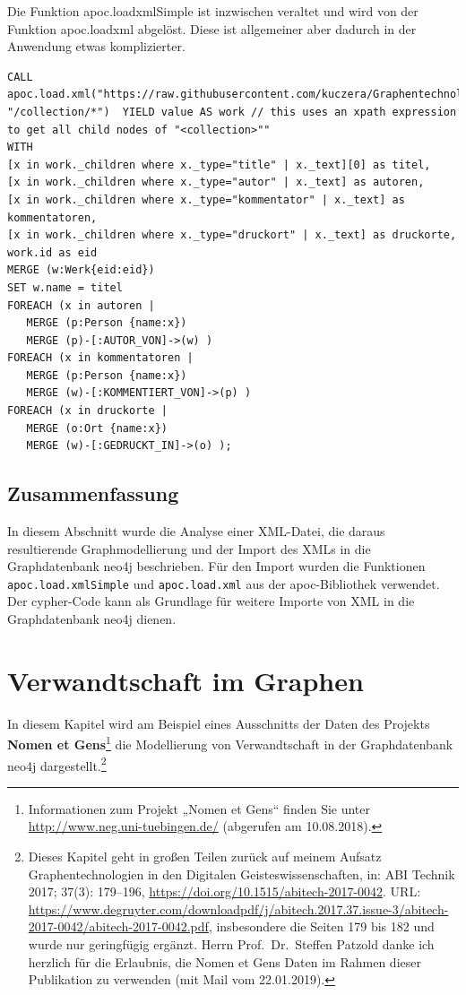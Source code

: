 \documentclass[ngerman,]{scrreprt}
\begin{document}
Die Funktion apoc.loadxmlSimple ist inzwischen veraltet und wird von der Funktion apoc.loadxml abgelöst. Diese ist allgemeiner aber dadurch in der Anwendung etwas komplizierter.

\begin{verbatim}
CALL
apoc.load.xml("https://raw.githubusercontent.com/kuczera/Graphentechnologien/master/docs/data/kollatz.xml", "/collection/*")  YIELD value AS work // this uses an xpath expression to get all child nodes of "<collection>""
WITH
[x in work._children where x._type="title" | x._text][0] as titel,
[x in work._children where x._type="autor" | x._text] as autoren,
[x in work._children where x._type="kommentator" | x._text] as kommentatoren,
[x in work._children where x._type="druckort" | x._text] as druckorte,
work.id as eid
MERGE (w:Werk{eid:eid})
SET w.name = titel
FOREACH (x in autoren |
   MERGE (p:Person {name:x})
   MERGE (p)-[:AUTOR_VON]->(w) )
FOREACH (x in kommentatoren |
   MERGE (p:Person {name:x})
   MERGE (w)-[:KOMMENTIERT_VON]->(p) )
FOREACH (x in druckorte |
   MERGE (o:Ort {name:x})
   MERGE (w)-[:GEDRUCKT_IN]->(o) );
\end{verbatim}

\section{Zusammenfassung}\label{zusammenfassung-2}

In diesem Abschnitt wurde die Analyse einer XML-Datei, die daraus resultierende Graphmodellierung und der Import des XMLs in die Graphdatenbank neo4j beschrieben. Für den Import wurden die Funktionen \texttt{apoc.load.xmlSimple} und \texttt{apoc.load.xml} aus der apoc-Bibliothek verwendet. Der cypher-Code kann als Grundlage für weitere Importe von XML in die Graphdatenbank neo4j dienen.

\chapter{Verwandtschaft im Graphen}\label{verwandtschaft-im-graphen}

In diesem Kapitel wird am Beispiel eines Ausschnitts der Daten des Projekts \textbf{Nomen et Gens}\footnote{Informationen zum Projekt „Nomen et Gens`` finden Sie unter \url{http://www.neg.uni-tuebingen.de/} (abgerufen am 10.08.2018).} die Modellierung von Verwandtschaft in der Graphdatenbank neo4j dargestellt.\footnote{Dieses Kapitel geht in großen Teilen zurück auf meinem Aufsatz Graphentechnologien in den Digitalen Geisteswissenschaften, in: ABI Technik 2017; 37(3): 179--196, \url{https://doi.org/10.1515/abitech-2017-0042}. URL: \url{https://www.degruyter.com/downloadpdf/j/abitech.2017.37.issue-3/abitech-2017-0042/abitech-2017-0042.pdf}, insbesondere die Seiten 179 bis 182 und wurde nur geringfügig ergänzt. Herrn Prof.~Dr.~Steffen Patzold danke ich herzlich für die Erlaubnis, die Nomen et Gens Daten im Rahmen dieser Publikation zu verwenden (mit Mail vom 22.01.2019).}
\end{document}
